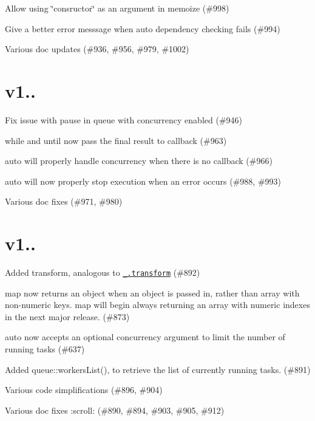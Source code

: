 
\begin{DoxyItemize}
\item Allow using {\ttfamily \char`\"{}consructor\char`\"{}} as an argument in {\ttfamily memoize} (\#998)
\item Give a better error messsage when {\ttfamily auto} dependency checking fails (\#994)
\item Various doc updates (\#936, \#956, \#979, \#1002)
\end{DoxyItemize}

\section*{v1..}


\begin{DoxyItemize}
\item Fix issue with {\ttfamily pause} in {\ttfamily queue} with concurrency enabled (\#946)
\item {\ttfamily while} and {\ttfamily until} now pass the final result to callback (\#963)
\item {\ttfamily auto} will properly handle concurrency when there is no callback (\#966)
\item {\ttfamily auto} will now properly stop execution when an error occurs (\#988, \#993)
\item Various doc fixes (\#971, \#980)
\end{DoxyItemize}

\section*{v1..}


\begin{DoxyItemize}
\item Added {\ttfamily transform}, analogous to \href{http://lodash.com/docs#transform}{\tt {\ttfamily \+\_\+.\+transform}} (\#892)
\item {\ttfamily map} now returns an object when an object is passed in, rather than array with non-\/numeric keys. {\ttfamily map} will begin always returning an array with numeric indexes in the next major release. (\#873)
\item {\ttfamily auto} now accepts an optional {\ttfamily concurrency} argument to limit the number of running tasks (\#637)
\item Added {\ttfamily queue\+::workers\+List()}, to retrieve the list of currently running tasks. (\#891)
\item Various code simplifications (\#896, \#904)
\item Various doc fixes \+:scroll\+: (\#890, \#894, \#903, \#905, \#912)
\end{DoxyItemize}

